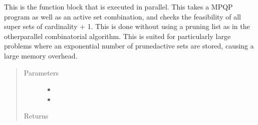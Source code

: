 \documentclass[letterpaper,10pt,english]{sphinxmanual}
\begin{document}
\begin{fulllineitems}
\label{\detokenize{ppopt.mp_solvers:ppopt.mp_solvers.mpqp_parrallel_combinatorial_exp.full_process}}
\sphinxAtStartPar
This is the function block that is executed in parallel. This takes a MPQP program as well as an active set combination, and checks the feasibility of all super sets of cardinality + 1. This is done without using a pruning list as in the otherparallel combinatorial algorithm. This is suited for particularly large problems where an exponential number of prunedactive sets are stored, causing a large memory overhead.
\begin{quote}\begin{description}
\item[{Parameters}] \leavevmode\begin{itemize}
\item {} 
\sphinxAtStartPar
{} \textendash{} 

\item {} 
\sphinxAtStartPar
{} \textendash{} 

\end{itemize}

\item[{Returns}] \leavevmode
\sphinxAtStartPar


\end{description}\end{quote}

\end{fulllineitems}

\end{document}
